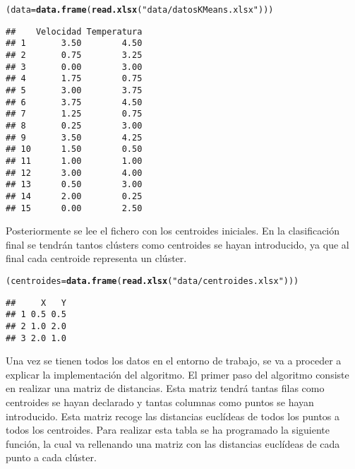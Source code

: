 \documentclass[12pt]{report}\usepackage[]{graphicx}\usepackage[dvipsnames]{xcolor}
\makeatletter
\newcommand{\hlstr}[1]{\textcolor[rgb]{0.192,0.494,0.8}{#1}}%
\newcommand{\hlstd}[1]{\textcolor[rgb]{0.345,0.345,0.345}{#1}}%
\newcommand{\hlkwb}[1]{\textcolor[rgb]{0.69,0.353,0.396}{#1}}%
\newcommand{\hlkwd}[1]{\textcolor[rgb]{0.737,0.353,0.396}{\textbf{#1}}}%
\newenvironment{kframe}{%
 \def\at@end@of@kframe{}%
 \ifinner\ifhmode%
  \def\at@end@of@kframe{\end{minipage}}%
  \begin{minipage}{\columnwidth}%
 \fi\fi%
 \def\FrameCommand##1{\hskip\@totalleftmargin \hskip-\fboxsep
 \colorbox{shadecolor}{##1}\hskip-\fboxsep
     \hskip-\linewidth \hskip-\@totalleftmargin \hskip\columnwidth}%
 \MakeFramed {\advance\hsize-\width
   \@totalleftmargin\z@ \linewidth\hsize
   \@setminipage}}%
 {\par\unskip\endMakeFramed%
 \at@end@of@kframe}
\newenvironment{knitrout}{}{} %
\makeatother
\begin{document}
\begin{knitrout}
\color{fgcolor}\begin{kframe}
\begin{alltt}
\hlstd{(data} \hlkwb{=} \hlkwd{data.frame}\hlstd{(}\hlkwd{read.xlsx}\hlstd{(}\hlstr{"data/datosKMeans.xlsx"}\hlstd{)))}
\end{alltt}
\begin{verbatim}
##    Velocidad Temperatura
## 1       3.50        4.50
## 2       0.75        3.25
## 3       0.00        3.00
## 4       1.75        0.75
## 5       3.00        3.75
## 6       3.75        4.50
## 7       1.25        0.75
## 8       0.25        3.00
## 9       3.50        4.25
## 10      1.50        0.50
## 11      1.00        1.00
## 12      3.00        4.00
## 13      0.50        3.00
## 14      2.00        0.25
## 15      0.00        2.50
\end{verbatim}
\end{kframe}
\end{knitrout}
				 
				 Posteriormente se lee el fichero con los centroides iniciales. En la clasificación final se tendrán tantos clústers como centroides se hayan introducido, ya que al final cada centroide representa un clúster.
				 
\begin{knitrout}
\color{fgcolor}\begin{kframe}
\begin{alltt}
\hlstd{(centroides} \hlkwb{=} \hlkwd{data.frame}\hlstd{(}\hlkwd{read.xlsx}\hlstd{(}\hlstr{"data/centroides.xlsx"}\hlstd{)))}
\end{alltt}
\begin{verbatim}
##     X   Y
## 1 0.5 0.5
## 2 1.0 2.0
## 3 2.0 1.0
\end{verbatim}
\end{kframe}
\end{knitrout}
				 
				 Una vez se tienen todos los datos en el entorno de trabajo, se va a proceder a explicar la implementación del algoritmo. El primer paso del algoritmo consiste en realizar una matriz de distancias. Esta matriz tendrá tantas filas como centroides se hayan declarado y tantas columnas como puntos se hayan introducido. Esta matriz recoge las distancias euclídeas de todos los puntos a todos los centroides. Para realizar esta tabla se ha programado la siguiente función, la cual va rellenando una matriz con las distancias euclídeas de cada punto a cada clúster.
				 
\end{document}
